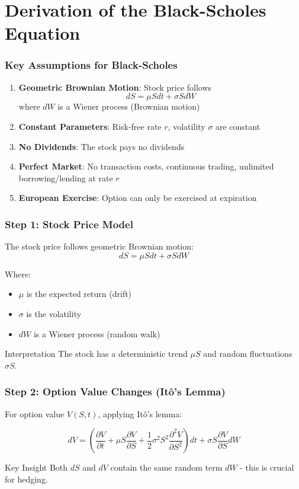 \documentclass{beamer}
\begin{document}
\section{Derivation of the Black-Scholes Equation}

\begin{frame}
\frametitle{Key Assumptions for Black-Scholes}
\begin{enumerate}
\item \textbf{Geometric Brownian Motion}: Stock price follows
$$dS = \mu S dt + \sigma S dW$$
where $dW$ is a Wiener process (Brownian motion)

\item \textbf{Constant Parameters}: Risk-free rate $r$, volatility $\sigma$ are constant

\item \textbf{No Dividends}: The stock pays no dividends

\item \textbf{Perfect Market}: No transaction costs, continuous trading, unlimited borrowing/lending at rate $r$

\item \textbf{European Exercise}: Option can only be exercised at expiration
\end{enumerate}
\end{frame}

\begin{frame}
\frametitle{Step 1: Stock Price Model}
The stock price follows geometric Brownian motion:
$$dS = \mu S dt + \sigma S dW$$

Where:
\begin{itemize}
\item $\mu$ is the expected return (drift)
\item $\sigma$ is the volatility  
\item $dW$ is a Wiener process (random walk)
\end{itemize}

\begin{block}{Interpretation}
The stock has a deterministic trend $\mu S$ and random fluctuations $\sigma S$.
\end{block}
\end{frame}

\begin{frame}
\frametitle{Step 2: Option Value Changes (Itô's Lemma)}
For option value $V(S,t)$, applying Itô's lemma:

$$dV = \left(\frac{\partial V}{\partial t} + \mu S \frac{\partial V}{\partial S} + \frac{1}{2}\sigma^2 S^2 \frac{\partial^2 V}{\partial S^2}\right) dt + \sigma S \frac{\partial V}{\partial S} dW$$

\begin{block}{Key Insight}
Both $dS$ and $dV$ contain the same random term $dW$ - this is crucial for hedging.
\end{block}
\end{frame}
\end{document}

